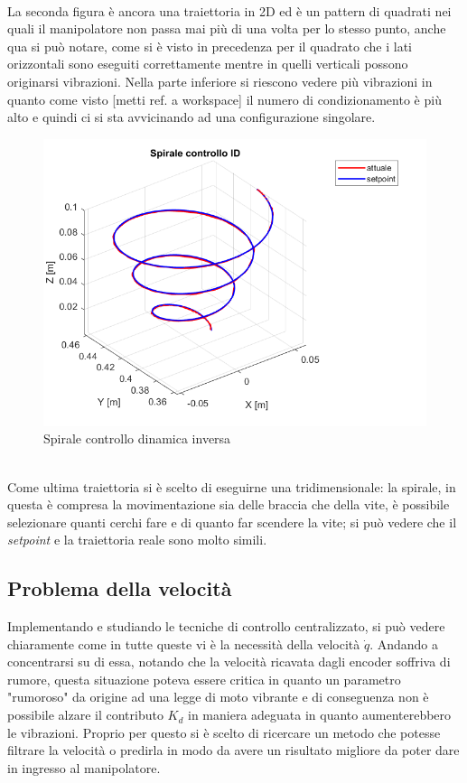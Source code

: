 \\La seconda figura è ancora una traiettoria in 2D ed è un pattern di quadrati nei quali il manipolatore non passa mai più di una volta per lo stesso punto, anche qua si può notare, come si è visto in precedenza per il quadrato che i lati orizzontali sono eseguiti correttamente mentre in quelli verticali possono originarsi vibrazioni. Nella parte inferiore si riescono vedere più vibrazioni in quanto come visto [metti ref. a workspace] il numero di condizionamento è più alto e quindi ci si sta avvicinando ad una configurazione singolare.
\begin{figure}[ht]
	\begin{center}
		\includegraphics[scale=0.5]{Immagini/Traiettorie/SpiraleID}
		\caption{Spirale controllo dinamica inversa}
		\label{fig:SpiraleID}
	\end{center}
\end{figure}
\\Come ultima traiettoria si è scelto di eseguirne una tridimensionale: la spirale, in questa è compresa la movimentazione sia delle braccia che della vite, è possibile selezionare quanti cerchi fare e di quanto far scendere la vite; si può vedere che il \textit{setpoint} e la traiettoria reale sono molto simili.
\subsection{Problema della velocità}
Implementando e studiando le tecniche di controllo centralizzato, si può vedere chiaramente come in tutte queste vi è la necessità della velocità $\dot{q}$. Andando a concentrarsi su di essa, notando che la velocità ricavata dagli encoder soffriva di rumore, questa situazione poteva essere critica in quanto un parametro "rumoroso" da origine ad una legge di moto vibrante e di conseguenza non è possibile alzare il contributo $K_d$ in maniera adeguata in quanto aumenterebbero le vibrazioni. Proprio per questo si è scelto di ricercare un metodo che potesse filtrare la velocità o predirla in modo da avere un risultato migliore da poter dare in ingresso al manipolatore.
